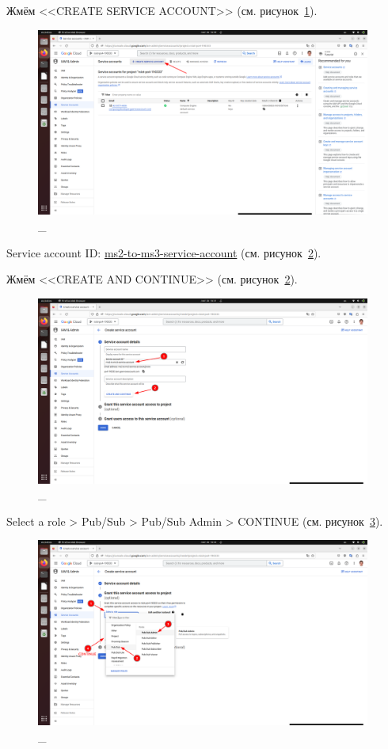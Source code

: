 \documentclass[12pt, a4paper, simple]{eskdtext}
\begin{document}
  \newpage
  Жмём <<CREATE SERVICE ACCOUNT>> (см. рисунок~\ref{fig:6}).

  \begin{figure}[!h]
    \centering
    \includegraphics[width=11cm]
    {images/2023-02-26_16-49-46.png}
    \caption{\_}
    \label{fig:6}
  \end{figure}

  Service account ID: \underline{ms2-to-ms3-service-account} (см. рисунок~\ref{fig:7}).

  Жмём <<CREATE AND CONTINUE>> (см. рисунок~\ref{fig:7}).

  \begin{figure}[!h]
    \centering
    \includegraphics[width=11cm]
    {images/2023-02-26_16-52-22.png}
    \caption{\_}
    \label{fig:7}
  \end{figure}

  Select a role > Pub/Sub > Pub/Sub Admin > CONTINUE (см. рисунок~\ref{fig:8}).

  \begin{figure}[!h]
    \centering
    \includegraphics[width=11cm]
    {images/2023-02-26_16-55-33.png}
    \caption{\_}
    \label{fig:8}
  \end{figure}
\end{document}
